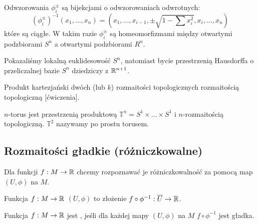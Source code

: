 \begin{example}
      Odwzorowania $\phi_i^\pm$ są bijekcjami o odwzorowaniach odwrotnych:
      $$(\phi_i^\pm)^{-1}(x_1,...,x_n)=(x_1,...,x_{i-1}, \pm\sqrt{1-\sum x_i^2},x_i,...,x_n)$$
      które są ciągłe. W takim razie $\phi_i^\pm$ są homeomorfizmami między otwartymi podzbiorami $S^n$ a otwartymi podzbiorami $R^n$.

      Pokazaliśmy lokalną euklidesowość $S^n$, natomiast bycie przestrzenią Hausdorffa o przeliczalnej bazie $S^n$ dziedziczy z $\mathbb{R}^{n+1}$.
      
    \item Produkt kartezjański dwóch (lub $k$) rozmaitości topologicznych rozmaitością topologiczną [ćwiczenia].
    \item $n$-torus jest przestrzenią produktową $\mathds{T}^n=S^1\times...\times S^1$ i $n$-rozmaitością topologiczną. $\mathds{T}^2$ nazywamy po prostu torusem.
\end{example}

\subsection{Rozmaitości gładkie (różniczkowalne)}

Dla funkcji $f:M\to \mathbb{R}$ chcemy rozpoznawać je różniczkowalność za pomocą map $(U, \phi)$ na $M$.

\begin{wrapfigure}{r}{5.5cm}
\centering
{}
\end{wrapfigure}
Funkcja $f:M\to\mathbb{R}$  $(U,\phi)$ to złożenie $f\circ\phi^{-1}:\overline{U}\to \mathbb{R}$.

\begin{definition} Funkcja $f:M\to \mathbb{R}$ jest , jeśli dla każdej mapy $(U, \phi)$ na $M$ $f\circ\phi^{-1}$ jest gładka.
\end{definition}

